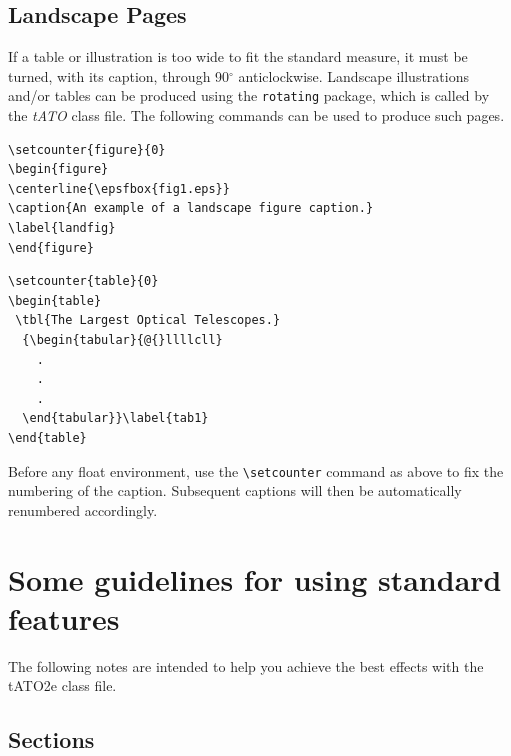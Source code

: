 \documentclass{tATO2e}
\begin{document}
\subsection{Landscape Pages}\label{eps}

If a table or illustration is too wide to fit the standard measure, it must be turned, with its caption,
through 90$^{\circ}$ anticlockwise. Landscape illustrations and/or tables can be produced using
the \verb"rotating" package, which is called by the \textit{tATO} class file. The following commands can
be used to produce such pages.
%
\begin{verbatim}
\setcounter{figure}{0}
\begin{figure}
\centerline{\epsfbox{fig1.eps}}
\caption{An example of a landscape figure caption.}
\label{landfig}
\end{figure}
\end{verbatim}

\begin{verbatim}
\setcounter{table}{0}
\begin{table}
 \tbl{The Largest Optical Telescopes.}
  {\begin{tabular}{@{}llllcll}
    .
    .
    .
  \end{tabular}}\label{tab1}
\end{table}
\end{verbatim}
%
Before any float environment, use the \verb"\setcounter" command
as above to fix the numbering of the caption. Subsequent captions
will then be automatically renumbered accordingly.


\section{Some guidelines for using standard features}

The following notes are intended to help you achieve the best effects with the tATO2e class file.


\subsection{Sections}
\end{document}
